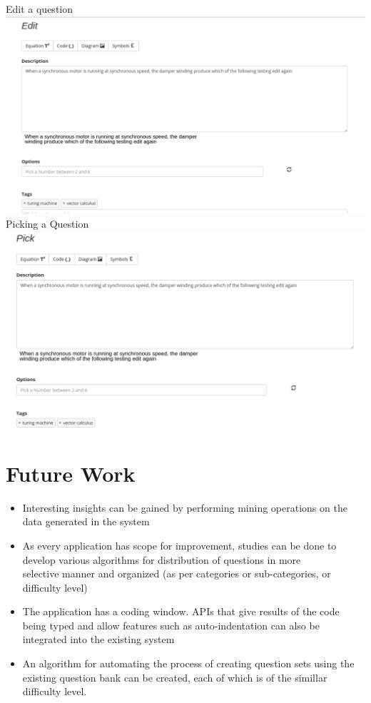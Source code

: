 \documentclass[a4paper,12pt,oneside]{book}
\begin{document}
\vspace{1in}
Edit a question \\
\includegraphics[scale=0.4]{edit.png}	\\

\vspace{2in}
Picking a Question \\
\includegraphics[scale=0.34]{pick.png}	\\

\vspace{4in}

\section{Future Work}
    \begin{itemize}
        \item Interesting insights can be gained by performing mining operations on the data generated in the system
        
        \item As every application has scope for improvement, studies can be done to develop various algorithms for distribution of questions in more \\selective manner and organized (as per categories or sub-categories, or difficulty level)
        
        \item The application has a coding window. APIs that give results of the code being typed and allow features such as auto-indentation can also be integrated into the existing system
        
        \item An algorithm for automating the process of creating question sets using the existing question bank can be created, each of which is of the simillar difficulty level.
    \end{itemize}
\end{document}
